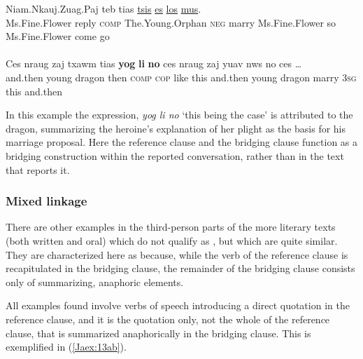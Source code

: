 \documentclass[output=paper]{LSP/langsci}
\begin{document}
\begin{exe}
\ex \label{Jaex:12ab}
\begin{xlist}
\ex \label{Jaex:12a}
\gll Niam.Nkauj.Zuag.Paj teb tias \underline{} \underline{tsis} \underline{} \underline{} \underline{es} \underline{}     \underline{los} \underline{mus}.        \\
 Ms.Fine.Flower reply \textsc{comp} The.Young.Orphan \textsc{neg} marry Ms.Fine.Flower so Ms.Fine.Flower come  go\\
\glt {}\\
\ex \label{Jaex:12b}
\gll Ces nraug  zaj txawm tias \textbf{yog} \textbf{li}  \textbf{no}  ces nraug  zaj   yuav   nws  no  ces …\\     	      
     and.then young dragon then \textsc{comp} \textsc{cop} like this and.then young dragon marry 3\textsc{sg} this and.then\\
\glt {} \citep[][163]{johnson92}
\end{xlist}
\end{exe}


\noindent
In this example the expression, \textit{yog li no} `this being the case' is attributed to the dragon, summarizing the heroine’s explanation of her plight as the basis for his marriage proposal. Here the reference clause and the bridging clause function as a bridging construction within the reported conversation, rather than in the  text that reports it.

\subsubsection{Mixed linkage}
\label{JaMixed}
There are other examples in the third-person  parts of the more literary texts (both written and oral) which do not qualify as , but which are quite similar. They are characterized here as  because, while the verb of the reference clause is recapitulated in the bridging clause, the remainder of the bridging clause consists only of summarizing, anaphoric elements.

All examples found involve verbs of speech introducing a direct quotation in the reference clause, and it is the quotation only, not the whole of the reference clause, that is summarized anaphorically in the bridging clause. This is exemplified in (\ref{Jaex:13ab}).
\end{document}
